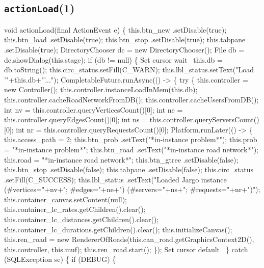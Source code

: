 \subsection{\texttt{actionLoad}(1)}
\nwenddocs{}\endmoddef{}
void actionLoad(final ActionEvent e) \{
  this.btn_new      .setDisable(true);
  this.btn_load     .setDisable(true);
  this.btn_stop     .setDisable(true);
  this.tabpane      .setDisable(true);
  DirectoryChooser dc = new DirectoryChooser();
  File db = dc.showDialog(this.stage);
  if (db != null) \{
    \LA{}Set cursor wait~{\nwtagstyle{}}\RA{}
    this.db = db.toString();
    this.circ_status.setFill(C_WARN);
    this.lbl_status.setText("Load '"+this.db+"'...");
    CompletableFuture.runAsync(() -> \{
      try \{
        this.controller = new Controller();
        this.controller.instanceLoadInMem(this.db);
        this.controller.cacheRoadNetworkFromDB();
        this.controller.cacheUsersFromDB();
        int nv = this.controller.queryVerticesCount()[0];
        int ne = this.controller.queryEdgesCount()[0];
        int ns = this.controller.queryServersCount()[0];
        int nr = this.controller.queryRequestsCount()[0];
        Platform.runLater(() -> \{
          this.access_path = 2;
          this.btn_prob     .setText("*in-instance problem*");
          this.prob = "*in-instance problem*";
          this.btn_road     .setText("*in-instance road network*");
          this.road = "*in-instance road network*";
          this.btn_gtree    .setDisable(false);
          this.btn_stop     .setDisable(false);
          this.tabpane      .setDisable(false);
          this.circ_status  .setFill(C_SUCCESS);
          this.lbl_status   .setText("Loaded Jargo instance (#vertices="+nv+"; #edges="+ne+") (#servers="+ns+"; #requests="+nr+")");
          this.container_canvas.setContent(null);
          this.container_lc_rates.getChildren().clear();
          this.container_lc_distances.getChildren().clear();
          this.container_lc_durations.getChildren().clear();
          this.initializeCanvas();
          this.ren_road = new RendererOfRoads(this.can_road.getGraphicsContext2D(), this.controller, this.muf);
          this.ren_road.start();
        \});
        \LA{}Set cursor default~{\nwtagstyle{}}\RA{}
      \} catch (SQLException se) \{
        if (DEBUG) \{
